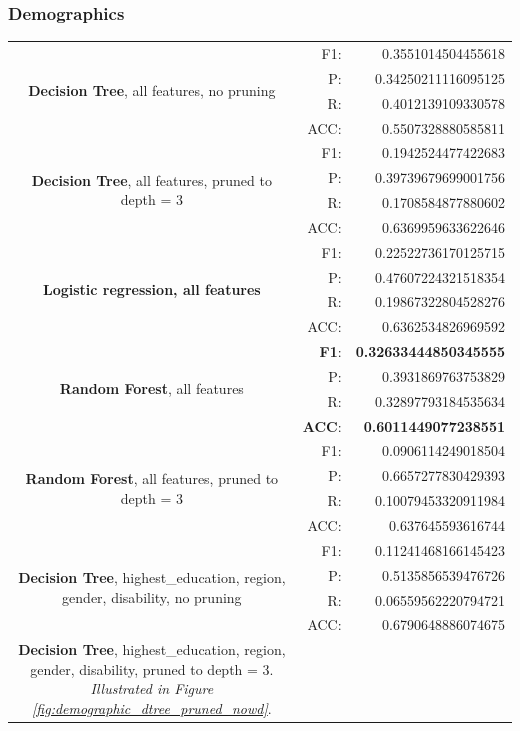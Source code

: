 \documentclass{article}
\begin{document}
\subsubsection{Demographics}
\begin{center}
\begin{tabular}{|c|rr|}
    \hline
    \multirow{4}{10cm}{\textbf{Decision Tree}, all features, no pruning}
&F1:&  0.3551014504455618\\
&P:&   0.34250211116095125\\
&R:&   0.4012139109330578\\
&ACC:& 0.5507328880585811\\
\hline
\multirow{4}{10cm}{\textbf{Decision Tree}, all features, pruned to depth = 3}
&F1:&  0.1942524477422683 \\
&P:&   0.39739679699001756 \\
&R:&   0.1708584877880602 \\
&ACC:& 0.6369959633622646 \\
\hline
\multirow{4}{10cm}{\textbf{Logistic regression, all features}}
&F1:&  0.22522736170125715\\
&P:&  0.47607224321518354\\
&R:&   0.19867322804528276\\
&ACC:& 0.6362534826969592\\
\hline
\multirow{4}{10cm}{\textbf{Random Forest}, all features }
&\textbf{F1}:&  \textbf{0.32633444850345555} \\
&P:&   0.3931869763753829  \\
&R:&   0.32897793184535634 \\
&\textbf{ACC}:& \textbf{0.6011449077238551} \\
\hline
\multirow{4}{10cm}{\textbf{Random Forest}, all features, pruned to depth = 3}
&F1:&  0.0906114249018504 \\
&P:&   0.6657277830429393 \\
&R:&   0.10079453320911984 \\
&ACC:& 0.637645593616744 \\
\hline
\hline
\hline
\multirow{4}{10cm}{\textbf{Decision Tree}, highest\_education, region, gender, disability, no pruning}
&F1:&  0.11241468166145423\\
&P:&   0.5135856539476726\\
&R:&   0.06559562220794721\\
&ACC:& 0.6790648886074675\\
\hline
\multirow{4}{10cm}{\textbf{Decision Tree}, highest\_education, region, gender, disability, pruned to depth = 3. \textit{Illustrated in Figure \ref{fig:demographic_dtree_pruned_nowd}}.}

\end{tabular}
\end{center}
\end{document}
